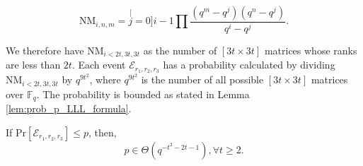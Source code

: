 \begin{equation}
\mathrm{NM}_{i,n,m}=\stackrel[j=0]{i-1}{\mathop{\prod}}\frac{\left(q^{m}-q^{j}\right)\left(q^{n}-q^{j}\right)}{q^{i}-q^{j}}.\label{eq:num_of_rank_t_matrices}
\end{equation}

We therefore have $\mathrm{NM}_{i<2t,3t,3t}$ as the number of $\left[3t\times3t\right]$
matrices whose ranks are less than $2t$. Each event $\mathcal{E}_{r_{1},r_{2},r_{3}}$
has a probability calculated by dividing $\mathrm{NM}_{i<2t,3t,3t}$
by $q^{9t^{2}}$, where $q^{9t^{2}}$ is the number of all possible
$\left[3t\times3t\right]$ matrices over $\ensuremath{\mathbb{F}}_{q}$.
The probability is bounded as stated in Lemma \ref{lem:prob_p_LLL_formula}.
\begin{lem}
\label{lem:prob_p_LLL_formula} If $\mathrm{Pr}\left[\mathcal{E}_{r_{1},r_{2},r_{3}}\right]\leq p$,
then,
\[
p\in\Theta\left(q^{-t^{2}-2t-1}\right),\forall t\geq2.
\]
\end{lem}
